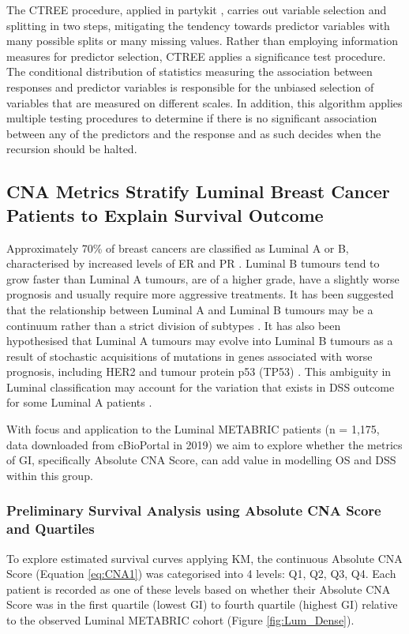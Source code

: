 The CTREE procedure, applied in partykit \citep{hothorn_hornik_zeileis_2006, ctree1}, carries out variable selection and splitting in two steps, mitigating the tendency towards predictor variables with many possible splits or many missing values. Rather than employing information measures for predictor selection, CTREE applies a significance test procedure. The conditional distribution of statistics measuring the association between responses and predictor variables is responsible for the unbiased selection of variables that are measured on different scales. In addition, this algorithm applies multiple testing procedures to determine if there is no significant association between any of the predictors and the response and as such decides when the recursion should be halted. 

\subsection{CNA Metrics Stratify Luminal Breast Cancer Patients to Explain Survival Outcome}
Approximately 70\% of breast cancers are classified as Luminal A or B, characterised by increased levels of ER and PR \citep{pmid27341628}. Luminal B tumours tend to grow faster than Luminal A tumours, are of a higher grade, have a slightly worse prognosis and usually require more aggressive treatments. It has been suggested that the relationship between Luminal A and Luminal B tumours may be a continuum rather than a strict division of subtypes \citep{pmid18662380, pmid22522925, pmid27341628}. It has also been hypothesised that Luminal A tumours may evolve into Luminal B tumours as a result of stochastic acquisitions of mutations in genes associated with worse prognosis, including HER2 and tumour protein p53 (TP53) \citep{PfefferUlrich2013CGMc}. This ambiguity in Luminal classification may account for the variation that exists in DSS outcome for some Luminal A patients \citep{pmid27341628, pmid26679376, pmid30849944, pmid37253056}.

With focus and application to the Luminal METABRIC patients (n = 1,175, data downloaded from cBioPortal in 2019) we aim to explore whether the metrics of GI, specifically Absolute CNA Score, can add value in modelling OS and DSS within this group. 

\subsubsection{Preliminary Survival Analysis using Absolute CNA Score and Quartiles}
To explore estimated survival curves applying KM, the continuous Absolute CNA Score (Equation \ref{eq:CNA1}) was categorised into 4 levels: Q1, Q2, Q3, Q4. Each patient is recorded as one of these levels based on whether their Absolute CNA Score was in the first quartile (lowest GI) to fourth quartile (highest GI) relative to the observed Luminal METABRIC cohort (Figure \ref{fig:Lum_Dense}). 

